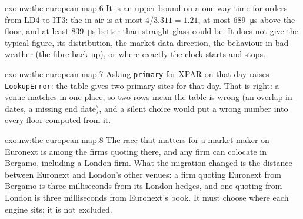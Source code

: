 \begin{solution}{exo:nw:the-european-map:6}
It is an upper bound on a one-way time for orders from LD4 to IT3: the  in air is at most $4/3.311 = 1.21$, at most
\qty{689}{\micro\second} above the floor, and at least \qty{839}{\micro\second} better than straight glass could be. It does not give the
typical figure, its distribution, the market-data direction, the behaviour in bad weather (the fibre back-up), or where exactly the clock
starts and stops.
\end{solution}

\begin{solution}{exo:nw:the-european-map:7}
Asking \texttt{primary} for XPAR on that day raises \texttt{LookupError}: the table gives two primary sites for that day. That is right: a venue matches in
one place, so two rows mean the table is wrong (an overlap in dates, a missing end date), and a silent choice would put a wrong number into
every floor computed from it.
\end{solution}

\begin{solution}{exo:nw:the-european-map:8}
The race that matters for a market maker on Euronext is among the firms quoting there, and any firm can colocate in Bergamo, including a
London firm. What the migration changed is the distance between Euronext and London's other venues: a firm quoting Euronext from Bergamo is
three milliseconds from its London hedges, and one quoting from London is three milliseconds from Euronext's book. It must choose where each
engine sits; it is not excluded.
\end{solution}

